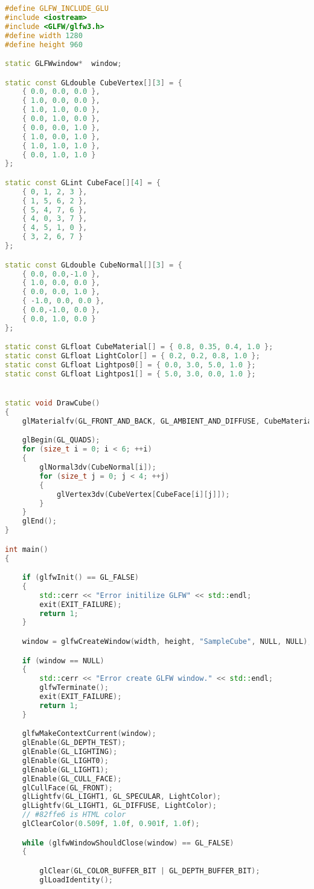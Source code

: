 \documentclass[12pt,a4paper]{jsarticle}
\begin{document}
\begin{lstlisting}[language=C++]
#define GLFW_INCLUDE_GLU
#include <iostream>
#include <GLFW/glfw3.h>
#define width 1280
#define height 960

static GLFWwindow*  window;

static const GLdouble CubeVertex[][3] = {
	{ 0.0, 0.0, 0.0 },
	{ 1.0, 0.0, 0.0 },
	{ 1.0, 1.0, 0.0 },
	{ 0.0, 1.0, 0.0 },
	{ 0.0, 0.0, 1.0 },
	{ 1.0, 0.0, 1.0 },
	{ 1.0, 1.0, 1.0 },
	{ 0.0, 1.0, 1.0 }
};

static const GLint CubeFace[][4] = {
	{ 0, 1, 2, 3 },
	{ 1, 5, 6, 2 },
	{ 5, 4, 7, 6 },
	{ 4, 0, 3, 7 },
	{ 4, 5, 1, 0 },
	{ 3, 2, 6, 7 }
};

static const GLdouble CubeNormal[][3] = {
	{ 0.0, 0.0,-1.0 },
	{ 1.0, 0.0, 0.0 },
	{ 0.0, 0.0, 1.0 },
	{ -1.0, 0.0, 0.0 },
	{ 0.0,-1.0, 0.0 },
	{ 0.0, 1.0, 0.0 }
};

static const GLfloat CubeMaterial[] = { 0.8, 0.35, 0.4, 1.0 };
static const GLfloat LightColor[] = { 0.2, 0.2, 0.8, 1.0 };
static const GLfloat Lightpos0[] = { 0.0, 3.0, 5.0, 1.0 };
static const GLfloat Lightpos1[] = { 5.0, 3.0, 0.0, 1.0 };


static void DrawCube()
{
	glMaterialfv(GL_FRONT_AND_BACK, GL_AMBIENT_AND_DIFFUSE, CubeMaterial);

	glBegin(GL_QUADS);
	for (size_t i = 0; i < 6; ++i)
	{
		glNormal3dv(CubeNormal[i]);
		for (size_t j = 0; j < 4; ++j)
		{
			glVertex3dv(CubeVertex[CubeFace[i][j]]);
		}
	}
	glEnd();
}

int main()
{

	if (glfwInit() == GL_FALSE)
	{
		std::cerr << "Error initilize GLFW" << std::endl;
		exit(EXIT_FAILURE);
		return 1;
	}

	window = glfwCreateWindow(width, height, "SampleCube", NULL, NULL);

	if (window == NULL)
	{
		std::cerr << "Error create GLFW window." << std::endl;
		glfwTerminate();
		exit(EXIT_FAILURE);
		return 1;
	}

	glfwMakeContextCurrent(window);
	glEnable(GL_DEPTH_TEST);
	glEnable(GL_LIGHTING);
	glEnable(GL_LIGHT0);
	glEnable(GL_LIGHT1);
	glEnable(GL_CULL_FACE);
	glCullFace(GL_FRONT);
	glLightfv(GL_LIGHT1, GL_SPECULAR, LightColor);
	glLightfv(GL_LIGHT1, GL_DIFFUSE, LightColor);
	// #82ffe6 is HTML color
	glClearColor(0.509f, 1.0f, 0.901f, 1.0f);

	while (glfwWindowShouldClose(window) == GL_FALSE)
	{

		glClear(GL_COLOR_BUFFER_BIT | GL_DEPTH_BUFFER_BIT);
		glLoadIdentity();



\end{lstlisting}
\end{document}
